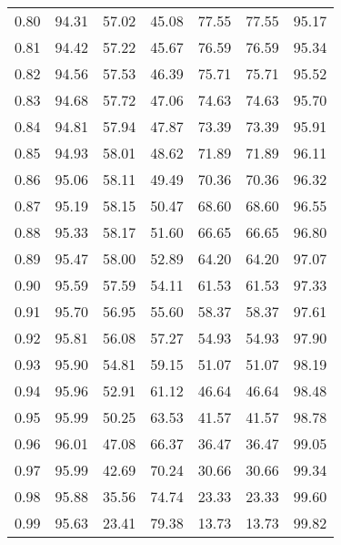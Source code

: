 \begin{tabular}{|c|c|c|c|c|c|c|}
      0.80 &     94.31 &     57.02 &      45.08 &   77.55 &      77.55 &         95.17 \\
      0.81 &     94.42 &     57.22 &      45.67 &   76.59 &      76.59 &         95.34 \\
      0.82 &     94.56 &     57.53 &      46.39 &   75.71 &      75.71 &         95.52 \\
      0.83 &     94.68 &     57.72 &      47.06 &   74.63 &      74.63 &         95.70 \\
      0.84 &     94.81 &     57.94 &      47.87 &   73.39 &      73.39 &         95.91 \\
      0.85 &     94.93 &     58.01 &      48.62 &   71.89 &      71.89 &         96.11 \\
      0.86 &     95.06 &     58.11 &      49.49 &   70.36 &      70.36 &         96.32 \\
      0.87 &     95.19 &     58.15 &      50.47 &   68.60 &      68.60 &         96.55 \\
      0.88 &     95.33 &     58.17 &      51.60 &   66.65 &      66.65 &         96.80 \\
      0.89 &     95.47 &     58.00 &      52.89 &   64.20 &      64.20 &         97.07 \\
      0.90 &     95.59 &     57.59 &      54.11 &   61.53 &      61.53 &         97.33 \\
      0.91 &     95.70 &     56.95 &      55.60 &   58.37 &      58.37 &         97.61 \\
      0.92 &     95.81 &     56.08 &      57.27 &   54.93 &      54.93 &         97.90 \\
      0.93 &     95.90 &     54.81 &      59.15 &   51.07 &      51.07 &         98.19 \\
      0.94 &     95.96 &     52.91 &      61.12 &   46.64 &      46.64 &         98.48 \\
      0.95 &     95.99 &     50.25 &      63.53 &   41.57 &      41.57 &         98.78 \\
      0.96 &     96.01 &     47.08 &      66.37 &   36.47 &      36.47 &         99.05 \\
      0.97 &     95.99 &     42.69 &      70.24 &   30.66 &      30.66 &         99.34 \\
      0.98 &     95.88 &     35.56 &      74.74 &   23.33 &      23.33 &         99.60 \\
      0.99 &     95.63 &     23.41 &      79.38 &   13.73 &      13.73 &         99.82 \\
\bottomrule
\end{tabular}
